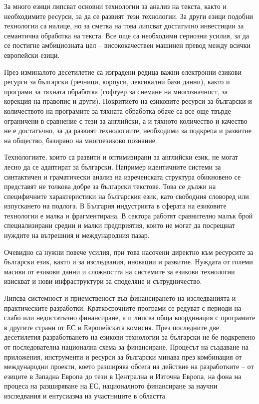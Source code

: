 \documentclass[]{../../metanetpaper}
\begin{document}
\begin{multicols}{2}
За много езици липсват основни технологии за анализ на текста, както и
необходимите ресурси, за да се развият тези технологии. За други езици
подобни технологии са налице, но за сметка на това липсват достатъчно
инвестиции за семантична обработка на текста. Все още са необходими
сериозни усилия, за да се постигне амбициозната цел -- висококачествен
машинен превод между всички европейски езици.

През изминалото десетилетие са изградени редица важни електронни
езикови ресурси за български (речници, корпуси, лексикални бази
данни), както и програми за тяхната обработка (софтуер за снемане на
многозначност, за корекция на правопис и други). Покритието на
езиковите ресурси за български и количеството на програмите за тяхната
обработка обаче са все още твърде ограничени в сравнение с тези за
английски, а и тяхното количество и качество не е достатъчно, за да
развият технологиите, необходими за подкрепа и развитие на общество,
базирано на многоезиково познание.

Технологиите, които са развити и оптимизирани за английски език, не
могат лесно да се адаптират за български. Например идентичните системи
за синтактичен и граматически анализ на изреченската структура
обикновено се представят не толкова добре за български текстове. Това
се дължи на специфичните характеристики на българския език, като
свободния словоред или изпускането на подлога.  В България индустрията
в сферата на езиковите технологии е малка и фрагментирана. В сектора
работят сравнително малък брой специализирани средни и малки
предприятия, които не могат да посрещнат нуждите на вътрешния и
международния пазар.

Очевидно са нужни повече усилия, при това насочени директно към
ресурсите за български език, както и за изследвания, иновации и
развитие.  Нуждата от големи масиви от езикови данни и сложността на
системите за езикови технологии изискват и нови инфраструктури за
споделяне и сътрудничество.

Липсва системност и приемственост във финансирането на изследванията и
практическите разработки. Краткосрочните програми се редуват с периоди
на слабо или недостатъчно финансиране, а и липсва обща координация с
програмите в другите страни от ЕС и Европейската комисия.  През
последните две десетилетия разработването на езикови технологии за
български не бе подкрепено от последователна национална схема за
финансиране. Процесът на създаване на приложения, инструменти и
ресурси за български минава през комбинация от международни проекти,
което разширява обсега на действие на разработките – от езиците в
Западна Европа до тези в Централна и Източна Европа, на фона на
процеса на разширяване на ЕС, националното финансиране за научни
изследвания и ентусиазма на участниците в областта.


\end{multicols}
\end{document}
